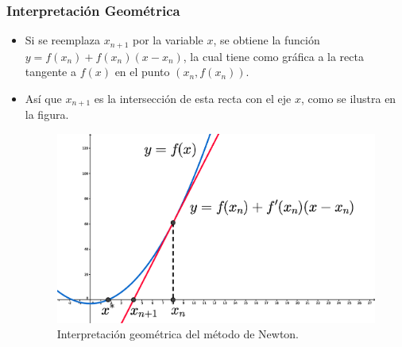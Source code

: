 \documentclass{beamer}
\begin{document}
\begin{frame}
  \frametitle{Interpretaci\'on Geom\'etrica}
  \begin{itemize}
    \item<1-> Si se reemplaza $x_{n+1}$ por la variable $x$, se obtiene la funci\'on $y = f(x_n) + f (x_n)(x - x_n)$, la cual tiene
    como gr\'afica a la recta tangente a $f(x)$ en el punto $(x_n , f (x_n))$.
    \item<2-> As\'i que $x_{n+1}$ es la intersecci\'on de
    esta recta con el eje $x$, como se ilustra en la figura.    
    \begin{figure}[ht]
    \begin{center}
      \includegraphics[scale=0.2]{./curva_newton.eps}
    \end{center}
    \caption{Interpretaci\'on geom\'etrica del m\'etodo de Newton.}
    \end{figure}
  \end{itemize}
\end{frame}
\end{document}
